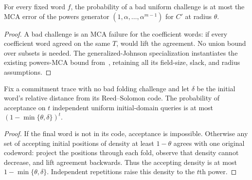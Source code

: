 \begin{theorem}\label{thm:fri-folding-error}
\leanok
{}
For every fixed word $f$, the probability of a bad uniform challenge is at most
the MCA error of the powers generator $(1,\alpha,\ldots,\alpha^{m-1})$ for $C'$
at radius $\theta$.
\end{theorem}
\begin{proof}
\leanok
A bad challenge is an MCA failure for the coefficient words: if every coefficient
word agreed on the same $T$,  would lift the
agreement. No union bound over subsets is needed. The generalized-Johnson
specialization instantiates the existing powers-MCA bound from~\cite{BCGM25},
retaining all its field-size, slack, and radius assumptions.
\end{proof}

\begin{theorem}\label{thm:fri-query-error}
\leanok
{}
Fix a commitment trace with no bad folding challenge and let $\delta$ be the
initial word's relative distance from its Reed--Solomon code. The probability of
acceptance on $t$ independent uniform initial-domain queries is at most
$(1-\min\{\theta,\delta\})^t$.
\end{theorem}
\begin{proof}
\leanok
If the final word is not in its code, acceptance is impossible. Otherwise any
set of accepting initial positions of density at least $1-\theta$ agrees with
one original codeword: project the positions through each fold, observe that
density cannot decrease, and lift agreement backwards. Thus the accepting
density is at most $1-\min\{\theta,\delta\}$. Independent repetitions raise this
density to the $t$th power.
\end{proof}

